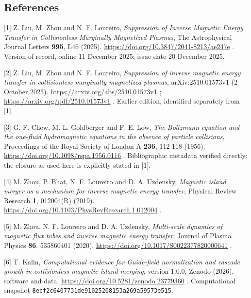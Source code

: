 \clearpage
\subsection{References}\label{references}

{[}1{]} Z. Liu, M. Zhou and N. F. Loureiro, \emph{Suppression of Inverse
Magnetic Energy Transfer in Collisionless Marginally Magnetized
Plasmas}, The Astrophysical Journal Letters \textbf{995}, L46 (2025).
\url{https://doi.org/10.3847/2041-8213/ae247e} . Version of record,
online 11 December 2025; issue date 20 December 2025.

{[}2{]} Z. Liu, M. Zhou and N. F. Loureiro, \emph{Suppression of inverse
magnetic energy transfer in collisionless marginally magnetized
plasmas}, arXiv:2510.01573v1 (2 October 2025).
\url{https://arxiv.org/abs/2510.01573v1} ;
\url{https://arxiv.org/pdf/2510.01573v1} . Earlier edition, identified
separately from {[}1{]}.

{[}3{]} G. F. Chew, M. L. Goldberger and F. E. Low, \emph{The Boltzmann
equation and the one-fluid hydromagnetic equations in the absence of
particle collisions}, Proceedings of the Royal Society of London A
\textbf{236}, 112-118 (1956).
\url{https://doi.org/10.1098/rspa.1956.0116} . Bibliographic metadata
verified directly; the closure as used here is explicitly stated in
{[}1{]}.

{[}4{]} M. Zhou, P. Bhat, N. F. Loureiro and D. A. Uzdensky,
\emph{Magnetic island merger as a mechanism for inverse magnetic energy
transfer}, Physical Review Research \textbf{1}, 012004(R) (2019).
\url{https://doi.org/10.1103/PhysRevResearch.1.012004} .

{[}5{]} M. Zhou, N. F. Loureiro and D. A. Uzdensky, \emph{Multi-scale
dynamics of magnetic flux tubes and inverse magnetic energy transfer},
Journal of Plasma Physics \textbf{86}, 535860401 (2020).
\url{https://doi.org/10.1017/S0022377820000641} .

{[}6{]} T. Kalin, \emph{Computational evidence for Guide-field
normalization and cascade growth in collisionless magnetic-island
merging}, version 1.0.0, Zenodo (2026), software and data.
\url{https://doi.org/10.5281/zenodo.23779360} . Computational snapshot
\nolinkurl{8ecf2c6407731de91025208153a269a59573e515}.

